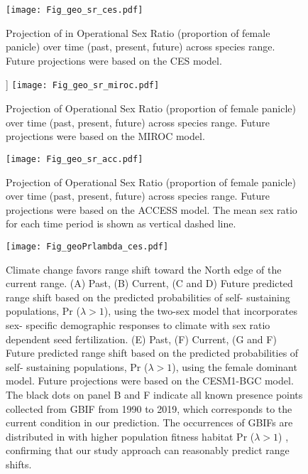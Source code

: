 \documentclass[9pt,twoside,lineno]{pnas-new}
\begin{document}
\begin{figure}
\centering
\texttt{[image: Fig\_geo\_sr\_ces.pdf]}
\caption{Projection of in Operational Sex Ratio (proportion of female panicle) over  time (past, present, future) across species range.
			Future projections were based on the CES model.
			}
\label{Sup:geoosrprojces}
\end{figure}

\begin{figure}]
 \centering
\texttt{[image: Fig\_geo\_sr\_miroc.pdf]}
\caption{Projection of Operational Sex Ratio (proportion of female panicle) over time (past, present, future) across species range.
			Future projections were based on the MIROC model.
			}
\label{Sup:geoosrprojmiroc}
\end{figure}

\begin{figure}
\centering
\texttt{[image: Fig\_geo\_sr\_acc.pdf]}
\caption{Projection  of Operational Sex Ratio (proportion of female panicle) over time (past, present, future) across species range.
			Future projections were based on the ACCESS  model.
			The mean sex ratio for each time period is shown as vertical dashed line.}
\label{Sup:geoosrprojacc}
\end{figure}


\begin{figure}
\centering
\texttt{[image: Fig\_geoPrlambda\_ces.pdf]}
\caption{Climate change favors range shift toward the North edge of the current range.
			(A) Past, (B) Current, (C and D) Future predicted range shift based on the predicted probabilities of self- sustaining populations, Pr ($\lambda > 1$), using the two-sex model that incorporates sex- specific demographic responses to climate with sex ratio dependent seed fertilization.
			(E) Past, (F) Current, (G and F) Future  predicted range shift based on the predicted probabilities of self- sustaining populations, Pr ($\lambda > 1$), using the female dominant model.
			Future projections were based on the CESM1-BGC model.
			The black dots on panel B and F indicate all known presence points collected from GBIF from 1990 to 2019, which corresponds to the current condition in our prediction. 
			The occurrences of GBIFs are distributed in with higher population fitness habitat Pr ($\lambda > 1$) , confirming that our study approach can reasonably predict range shifts. }
\label{Sup:geoprojces}
\end{figure}
\end{document}
